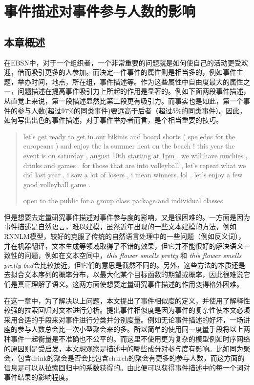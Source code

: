 % 
\section{事件描述对事件参与人数的影响} 
\subsection{本章概述} 
在$\mathrm{EBSN}$中，对于一个组织者，一个非常重要的问题就是如何使自己的活动更受欢迎，借而吸引更多的人参加。而决定一件事件的属性则是相当多的，例如事件主题，举办时间，地点，所在组，事件描述等。作为这些属性中自由度最大的属性之一，问题描述在提高事件吸引力上所起的作用是显著的。例如下面两段事件描述，从直觉上来说，第一段描述显然比第二段更有吸引力。而事实也是如此，第一个事件的参与人数(超过97\%的同类事件)要远高于后者（超过5\%的同类事件）。因此，如何写出出色的事件描述，对于事件举办者而言，是个相当重要的技巧。

\begin{quotation}
let's get ready to get in our bikinis and board shorts  (  spe
  edos for the europeans  )  and enjoy the la summer heat on the beach
  !  this year the event is on saturday  ,  august 10th starting at 
  1pm . we will have muchies  ,  drinks and games . for those that 
  are into volleyball  ,  let's repeat what we did last year . 
  i saw a lot of losers  ,  i mean winners. lol . let's enjoy 
  a few good volleyball game .

  open to the public for a group class package and individual classes
\end{quotation}

但是想要去定量研究事件描述对事件参与度的影响，又是很困难的。一方面是因为事件描述是自然语言，难以建模，虽然近年出现的一些文本建模的方法，例如RNNLM模型，较好的克服了传统的自然语言处理中的一些问题（例如反义词），并在机器翻译，文本生成等领域取得了不错的效果，但它并不能很好的解决语义一致性的问题，例如在文本空间中，\textit{this flower smells pretty} 和 \textit{this flower smells pretty bad}会比较接近，但它们的意思是截然不同的。另外，这些方法的本质还是去拟合文本序列的概率分布，以最大化某个目标函数的期望或概率，因此很难说它们是真正理解了语义。这两方面使想要定量研究事件描述的作用变得格外困难。

在这一章中，为了解决以上问题，本文提出了事件相似度的定义，并使用了解释性较强的拉索回归对文本进行分析。提出事件相似度是因为事件的复杂性使本文必须采用合适的手段来对事件进行分类并分别度量。例如无论事件描述的好坏，一场讲座的参与人数总会比一次小型聚会来的多。所以简单的使用同一度量手段将以上两种事件一起衡量是不准确也不公平的。而这里不使用更为复杂的模型例如时序网络的原因则是受\citep{noauthor_predicting_nodate}启发，本文想观察是描述中的哪些成分对参与度有影响。比如同为聚会，包含drink的聚会是否会比包含church的聚会有更多的参与人数，而这方面的信息是可以从拉索回归中的系数获得的。由此便可以获得事件描述中的每一个词对事件结果的影响程度。

